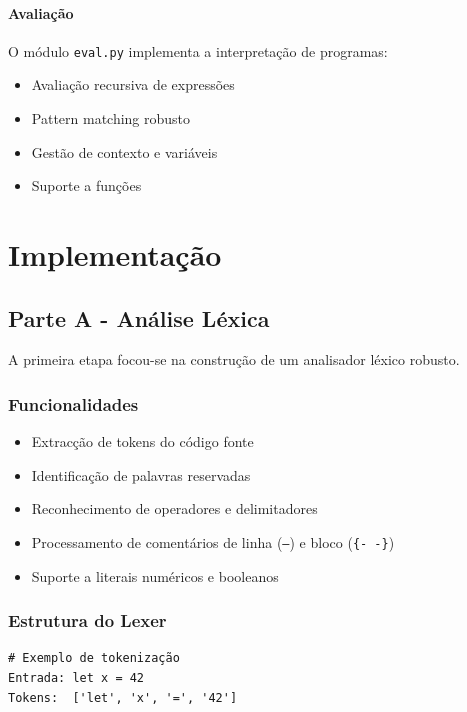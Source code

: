 \documentclass[11pt,a4paper]{report}
\begin{document}
\subsubsection{Avaliação}
O módulo \texttt{eval.py} implementa a interpretação de programas:
\begin{itemize}
    \item Avaliação recursiva de expressões
    \item Pattern matching robusto
    \item Gestão de contexto e variáveis
    \item Suporte a funções
\end{itemize}

\chapter{Implementação}

\section{Parte A - Análise Léxica}

A primeira etapa focou-se na construção de um analisador léxico robusto.

\subsection{Funcionalidades}

\begin{itemize}
    \item Extracção de tokens do código fonte
    \item Identificação de palavras reservadas
    \item Reconhecimento de operadores e delimitadores
    \item Processamento de comentários de linha (\texttt{--}) e bloco (\texttt{\{- -\}})
    \item Suporte a literais numéricos e booleanos
\end{itemize}

\subsection{Estrutura do Lexer}

\begin{lstlisting}
# Exemplo de tokenização
Entrada: let x = 42 
Tokens:  ['let', 'x', '=', '42']
\end{lstlisting}
\end{document}
